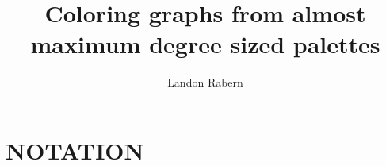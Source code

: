 \documentclass[oneside]{book}
\theoremstyle{plain}
\theoremstyle{definition}
\theoremstyle{plain}
\begin{document}
\frontmatter
\title{Coloring graphs from almost maximum degree sized palettes}
\author{Landon Rabern}


\maketitle


\setcounter{page}{2}
\setcounter{tocdepth}{4} 

\tableofcontents
%

\mainmatter










\clearpage
\appendix
\chapter{NOTATION}\label{NotationAppendix}
\vspace{-0.5in}


\backmatter
\nocite{*}


\end{document}
